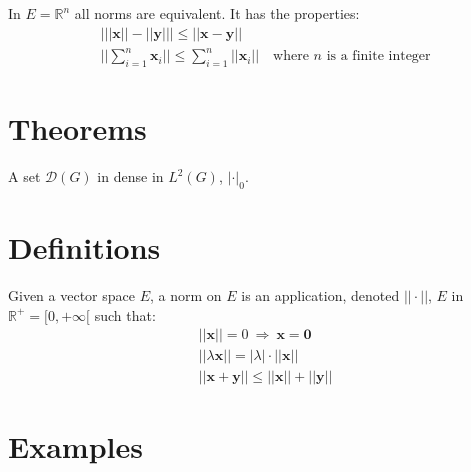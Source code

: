 \documentclass[
12pt, %
a4paper, %
fleqn,   %
]{notes}
\begin{document}
\begin{theorem}
    In $E=\mathbb{R}^n$ all norms are equivalent. It has the properties:
    \begin{align}
        & \big| ||\mathbf{x}|| - ||\mathbf{y}|| \big|\leq || \mathbf{x}-
        \mathbf{y}|| \\
        &  ||\sum_{i=1}^n\mathbf{x}_i||\leq
        \sum_{i=1}^n||\mathbf{x}_i||\quad\text{where $n$ is a finite integer}
    \end{align}
\end{theorem}


\section{Theorems}

\begin{theorem}
    A set $\mathcal{D}(G)$ in dense in $L^2(G)$, $|\cdot|_0$. 
\end{theorem}


\section{Definitions}

\begin{definition}
    Given a vector space $E$, a norm on $E$ is an application, denoted
    $||\cdot||$, $E$ in $\mathbb{R}^+=[0,+\infty[$ such that:
    \begin{align}
        & ||\mathbf{x}||=0\ \Rightarrow\ \mathbf{x}=\mathbf{0}\\
        & ||\lambda \mathbf{x}||=|\lambda|\cdot ||\mathbf{x}||\\
        & ||\mathbf{x}+\mathbf{y}||\leq ||\mathbf{x}||+||\mathbf{y}||
    \end{align}
\end{definition}


\section{Examples}
\end{document}
